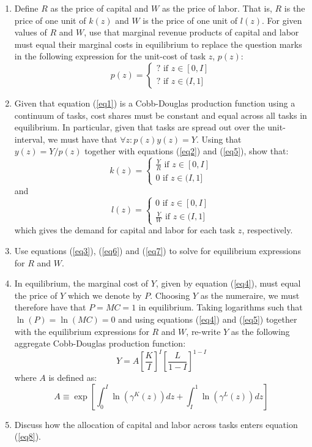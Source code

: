 \documentclass[a4paper,12pt]{article}
\begin{document}
\begin{enumerate}

\item[(2.1)] Define $R$ as the price of capital and $W$ as the price of labor. That is, $R$ is the price of one unit of $k(z)$ and $W$ is the price of one unit of $l(z)$. For given values of $R$ and $W$, use that marginal revenue products of capital and labor must equal their marginal costs in equilibrium to replace the question marks in the following expression for the unit-cost of task $z$, $p(z)$: \medskip
\[
p(z) = 
\begin{cases}
\textbf{?} \text{ if } z \in [0,I] \tag{2.5} \label{eq5} \\
\textbf{?} \text{ if } z \in (I,1] 
\end{cases}
\]

\item[(2.2)] Given that equation (\ref{eq1}) is a Cobb-Douglas production function using a continuum of tasks, cost shares must be constant and equal across all tasks in equilibrium. In particular, given that tasks are spread out over the unit-interval, we must have that $ \forall z: p(z)y(z)=Y$. Using that $y(z)=Y/p(z)$ together with equations (\ref{eq2}) and (\ref{eq5}), show that:  
\[
k(z)=
\begin{cases}
\frac{Y}{R} \text{ if } z \in [0,I] \tag{2.6} \label{eq6} \\
0 \text{ if } z \in (I,1]
\end{cases}
\]
and
\[
l(z)=
\begin{cases}
0 \text{ if } z \in [0,I]  \tag{2.7} \label{eq7} \\
\frac{Y}{W} \text{ if } z \in (I,1]
\end{cases}
\]
which gives the demand for capital and labor for each task $z$, respectively.

\item[(2.3)] Use equations (\ref{eq3}), (\ref{eq6}) and (\ref{eq7}) to solve for equilibrium expressions for $R$ and $W$.

\item[(2.4)] In equilibrium, the marginal cost of $Y$, given by equation (\ref{eq4}), must equal the price of $Y$ which we denote by $P$. Choosing $Y$ as the numeraire, we must therefore have that $P=MC=1$ in equilibrium. Taking logarithms such that $\ln(P)=\ln(MC)=0$ and using equations (\ref{eq4}) and (\ref{eq5}) together with the equilibrium expressions for $R$ and $W$, re-write $Y$ as the following aggregate Cobb-Douglas production function:
\[
Y = A \left[ \frac{K}{I} \right]^{I} \left[ \frac{L}{1-I} \right]^{1-I} \tag{2.8} \label{eq8}
\]
where $A$ is defined as:
\[
A \equiv \exp \left[ \int_{0}^{I} \ln(\gamma^{K}(z))dz + \int_{I}^{1} \ln(\gamma^{L}(z))dz \right] 
\]

\item[(2.5)] Discuss how the allocation of capital and labor across tasks enters equation (\ref{eq8}).

\end{enumerate}
\end{document}
